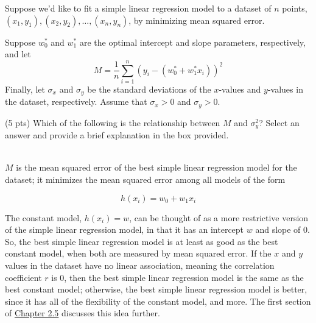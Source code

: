 \documentclass[11pt]{article}
\begin{document}
\begin{prob}[(14 pts)] Suppose we'd like to fit a simple linear regression model to a dataset of $n$ points, \\
$(x_1, y_1), (x_2, y_2), \ldots, (x_n, y_n)$, by minimizing mean squared error. 

Suppose $w_0^*$ and $w_1^*$ are the optimal intercept and slope parameters, respectively, and let
$$M = \frac{1}{n} \sum_{i=1}^n (y_i - (w_0^* + w_1^* x_i))^2$$
Finally, let $\sigma_x$ and $\sigma_y$ be the standard deviations of the $x$-values and $y$-values in the dataset, respectively. Assume that $\sigma_x > 0$ and $\sigma_y > 0$.

\begin{subprob}(5 pts) Which of the following is the relationship between $M$ and $\sigma_y^2$? Select an answer and provide a brief explanation in the box provided. \\

    \\

\emptybox{4cm}

\begin{solution}
$M$ is the mean squared error of the best simple linear regression model for the dataset; it minimizes the mean squared error among all models of the form

$$h(x_i) = w_0 + w_1 x_i$$

The constant model, $h(x_i) = w$, can be thought of as a more restrictive version of the simple linear regression model, in that it has an intercept $w$ and slope of $0$. So, the best simple linear regression model is at least as good as the best constant model, when both are measured by mean squared error. If the $x$ and $y$ values in the dataset have no linear association, meaning the correlation coefficient $r$ is 0, then the best simple linear regression model is the same as the best constant model; otherwise, the best simple linear regression model is better, since it has all of the flexibility of the constant model, and more. The first section of \href{https://notes.eecs245.org/simple-linear-regression/least-squares/}{Chapter 2.5} discusses this idea further.



\end{solution}

\end{subprob}


\end{prob}
\end{document}
